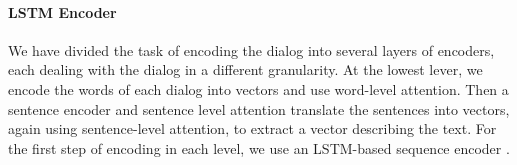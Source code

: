 \paragraph*{LSTM Encoder}
We have divided the task of encoding the dialog into several 
layers of encoders, each dealing with the dialog in a different granularity. 
At the lowest lever, we encode the words of each dialog into vectors 
and use word-level attention. Then a sentence encoder and sentence level attention 
translate the sentences into vectors, again using sentence-level attention, to extract a vector describing the text. 
For the first step of encoding in each level, we use an LSTM-based sequence encoder \cite{lstm,birnn}. 








